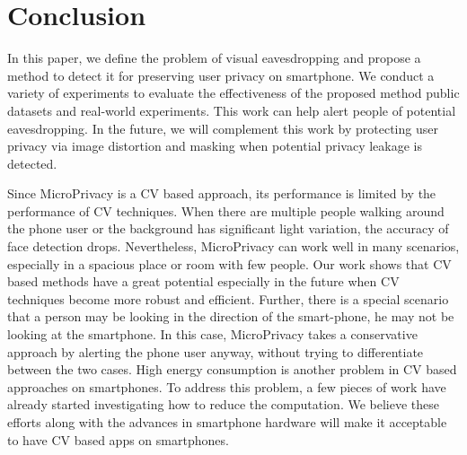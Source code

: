 \documentclass[10pt, conference, letterpaper]{IEEEtran}
\begin{document}


\IEEEpeerreviewmaketitle
















\section{Conclusion}
In this paper, we define the problem of  visual  eavesdropping  and propose a method to detect it for preserving user privacy on smartphone. We conduct a variety of  experiments to evaluate the effectiveness of the proposed method  public datasets and real-world experiments.  This work can help alert people of potential eavesdropping.  In the future, we will complement this work by protecting user privacy via image distortion and masking when potential privacy leakage is detected.

Since MicroPrivacy is a CV based approach, its performance is limited by the performance of CV techniques.  When there are multiple people walking around the phone user or the background has significant light variation, the accuracy of face detection drops. Nevertheless, MicroPrivacy can work well in many scenarios, especially in a spacious place or  room with few people.  Our work shows that CV based methods have a great potential especially in the future when CV techniques become more robust and efficient. Further, there is a special scenario that a person may be looking in the direction of the smart-phone, he may not be looking at the smartphone. In this case,  MicroPrivacy takes a conservative approach by alerting the phone user anyway, without trying to differentiate between the two cases.  High energy consumption is another problem in CV based approaches on smartphones. To address this problem, a few pieces of work have already started investigating how to reduce the computation\cite{mobilevision}.  We believe these efforts along with the advances in smartphone hardware will make it acceptable to have CV based apps on smartphones. 







\end{document}
